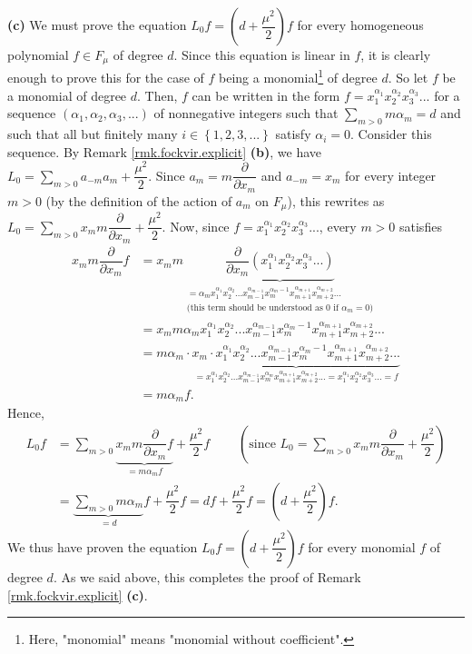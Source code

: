 \documentclass
[numbers=enddot,12pt,final,onecolumn,german,notitlepage]{scrartcl}%
\theoremstyle{definition}
\begin{document}
\textbf{(c)} We must prove the equation $L_{0}f=\left(  d+\dfrac{\mu^{2}}%
{2}\right)  f$ for every homogeneous polynomial $f\in F_{\mu}$ of degree $d$.
Since this equation is linear in $f$, it is clearly enough to prove this for
the case of $f$ being a monomial\footnote{Here, "monomial" means "monomial
without coefficient".} of degree $d$. So let $f$ be a monomial of degree $d$.
Then, $f$ can be written in the form $f=x_{1}^{\alpha_{1}}x_{2}^{\alpha_{2}%
}x_{3}^{\alpha_{3}}...$ for a sequence $\left(  \alpha_{1},\alpha_{2}%
,\alpha_{3},...\right)  $ of nonnegative integers such that $\sum
\limits_{m>0}m\alpha_{m}=d$ and such that all but finitely many $i\in\left\{
1,2,3,...\right\}  $ satisfy $\alpha_{i}=0$. Consider this sequence. By Remark
\ref{rmk.fockvir.explicit} \textbf{(b)}, we have $L_{0}=\sum\limits_{m>0}%
a_{-m}a_{m}+\dfrac{\mu^{2}}{2}$. Since $a_{m}=m\dfrac{\partial}{\partial
x_{m}}$ and $a_{-m}=x_{m}$ for every integer $m>0$ (by the definition of the
action of $a_{m}$ on $F_{\mu}$), this rewrites as $L_{0}=\sum\limits_{m>0}%
x_{m}m\dfrac{\partial}{\partial x_{m}}+\dfrac{\mu^{2}}{2}$. Now, since
$f=x_{1}^{\alpha_{1}}x_{2}^{\alpha_{2}}x_{3}^{\alpha_{3}}...$, every $m>0$
satisfies%
\begin{align*}
x_{m}m\dfrac{\partial}{\partial x_{m}}f  &  =x_{m}m\underbrace{\dfrac
{\partial}{\partial x_{m}}\left(  x_{1}^{\alpha_{1}}x_{2}^{\alpha_{2}}%
x_{3}^{\alpha_{3}}...\right)  }_{\substack{=\alpha_{m}x_{1}^{\alpha_{1}}%
x_{2}^{\alpha_{2}}...x_{m-1}^{\alpha_{m-1}}x_{m}^{\alpha_{m}-1}x_{m+1}%
^{\alpha_{m+1}}x_{m+2}^{\alpha_{m+2}}...\\\text{(this term should be
understood as }0\text{ if }\alpha_{m}=0\text{)}}}\\
&  =x_{m}m\alpha_{m}x_{1}^{\alpha_{1}}x_{2}^{\alpha_{2}}...x_{m-1}%
^{\alpha_{m-1}}x_{m}^{\alpha_{m}-1}x_{m+1}^{\alpha_{m+1}}x_{m+2}^{\alpha
_{m+2}}...\\
&  =m\alpha_{m}\cdot\underbrace{x_{m}\cdot x_{1}^{\alpha_{1}}x_{2}^{\alpha
_{2}}...x_{m-1}^{\alpha_{m-1}}x_{m}^{\alpha_{m}-1}x_{m+1}^{\alpha_{m+1}%
}x_{m+2}^{\alpha_{m+2}}...}_{=x_{1}^{\alpha_{1}}x_{2}^{\alpha_{2}}%
...x_{m-1}^{\alpha_{m-1}}x_{m}^{\alpha_{m}}x_{m+1}^{\alpha_{m+1}}%
x_{m+2}^{\alpha_{m+2}}...=x_{1}^{\alpha_{1}}x_{2}^{\alpha_{2}}x_{3}%
^{\alpha_{3}}...=f}\\
&  =m\alpha_{m}f.
\end{align*}
Hence,
\begin{align*}
L_{0}f  &  =\sum\limits_{m>0}\underbrace{x_{m}m\dfrac{\partial}{\partial
x_{m}}f}_{=m\alpha_{m}f}+\dfrac{\mu^{2}}{2}f\ \ \ \ \ \ \ \ \ \ \left(
\text{since }L_{0}=\sum\limits_{m>0}x_{m}m\dfrac{\partial}{\partial x_{m}%
}+\dfrac{\mu^{2}}{2}\right) \\
&  =\underbrace{\sum\limits_{m>0}m\alpha_{m}}_{=d}f+\dfrac{\mu^{2}}%
{2}f=df+\dfrac{\mu^{2}}{2}f=\left(  d+\dfrac{\mu^{2}}{2}\right)  f.
\end{align*}
We thus have proven the equation $L_{0}f=\left(  d+\dfrac{\mu^{2}}{2}\right)
f$ for every monomial $f$ of degree $d$. As we said above, this completes the
proof of Remark \ref{rmk.fockvir.explicit} \textbf{(c)}.
\end{document}
